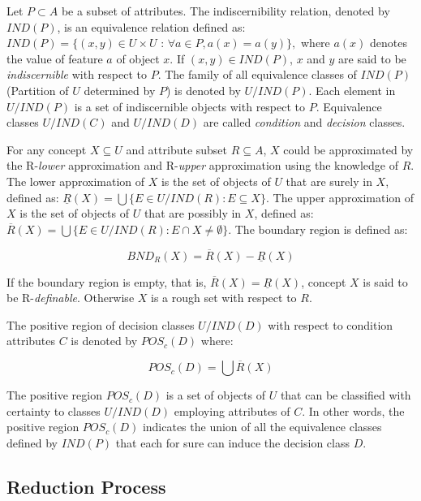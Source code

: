 \documentclass{llncs}
\begin{document}
Let $P \subset A$ be a subset of attributes. The indiscernibility relation, denoted by $IND(P)$, is an equivalence relation defined as: $IND(P) =  \{(x, y) \in U \times U \mbox{ : } \forall a \in P, a(x) = a(y)\},$ where $a(x)$ denotes the value of feature $a$ of object $x$. If $(x, y) \in IND(P)$, $x$ and $y$ are said to be \emph{indiscernible} with respect to $P$. The family of all equivalence classes of $IND(P)$ (Partition of $U$ determined by $P$) is denoted by $U/IND(P)$. Each element
in $U/IND(P)$ is a set of indiscernible objects with respect to $P$. Equivalence classes $U/IND(C)$ and $U/IND(D)$
are called \emph{condition} and \emph{decision} classes.


For any concept $X \subseteq U$ and attribute subset $R \subseteq A$, $X$ could be approximated by the R-\emph{lower} approximation and R-\emph{upper} approximation using the knowledge of $R$. The lower approximation of $X$ is the set of objects of $U$ that are surely in $X$, defined as: $ \underline{R}(X) = \bigcup \{E \in U/IND(R)  : E \subseteq X \}.$ The upper approximation of $X$ is the set of objects of $U$ that are possibly in $X$, defined as: $\overline{R}(X) = \bigcup \{E \in U/IND(R)  : E \cap X \ne \emptyset \}$. The boundary region is defined as:

\begin{displaymath}
BND_R(X) = \overline{R}(X) - \underline{R}(X)
\end{displaymath}

If the boundary region is empty, that is, $\overline{R}(X) = \underline{R}(X)$, concept $X$ is said to be R-\emph{definable}. Otherwise $X$ is a rough set with respect to $R$.

The positive region of decision classes $U/IND(D)$ with respect to condition attributes $C$ is denoted by $POS_c(D)$ where:

\begin{displaymath}
POS_c(D) = \bigcup \overline{R}(X)
\end{displaymath}

The positive region $POS_c(D)$ is a set of objects  of $U$ that can be classified with certainty to classes $U/IND(D)$ employing attributes of $C$. In other words, the positive region $POS_c(D)$ indicates the union of all the equivalence classes defined by $IND(P)$ that each for sure can induce the decision class $D$.

\subsection{Reduction Process}
\label{subsec:quickreduct}
\end{document}
